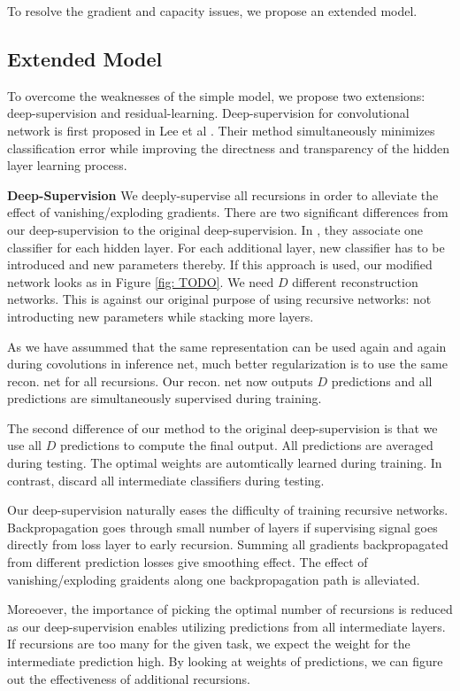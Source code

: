 \documentclass[10pt,twocolumn,letterpaper]{article}
\begin{document}
To resolve the gradient and capacity issues, we propose an extended model.

\subsection{Extended Model} 
To overcome the weaknesses of the simple model, we propose two extensions: deep-supervision and residual-learning. Deep-supervision for convolutional network is first proposed in Lee et al  \cite{lee2014deeply}. Their method simultaneously minimizes classification error while improving the directness and transparency of the hidden layer learning process.

\textbf{Deep-Supervision} We deeply-supervise all recursions in order to alleviate the effect of vanishing/exploding gradients. There are two significant differences from our deep-supervision to the original deep-supervision. In \cite{lee2014deeply}, they associate one classifier for each hidden layer. For each additional layer, new classifier has to be introduced and new parameters thereby. If this approach is used, our modified network looks as in Figure \ref{fig: TODO}. We need $D$ different reconstruction networks. This is against our original purpose of using recursive networks: not introducting new parameters while stacking more layers. 

As we have assummed that the same representation can be used again and again during covolutions in inference net, much better regularization is to use the same recon. net for all recursions. Our recon. net now outputs $D$ predictions and all predictions are simultaneously supervised during training. 

The second difference of our method to the original deep-supervision is that we use all $D$ predictions to compute the final output. All predictions are averaged during testing. The optimal weights are automtically learned during training. In contrast,  \cite{lee2014deeply} discard all intermediate classifiers during testing. 

Our deep-supervision naturally eases the difficulty of training recursive networks. Backpropagation goes through small number of layers if supervising signal goes directly from loss layer to early recursion. Summing all gradients backpropagated from different prediction losses give smoothing effect. The effect of vanishing/exploding graidents along one backpropagation path is alleviated.

Moreoever, the importance of picking the optimal number of recursions is reduced as our deep-supervision enables utilizing predictions from all intermediate layers. If recursions are too many for the given task, we expect the weight for the intermediate prediction high. By looking at weights of predictions, we can figure out the effectiveness of additional recursions. 
\end{document}
